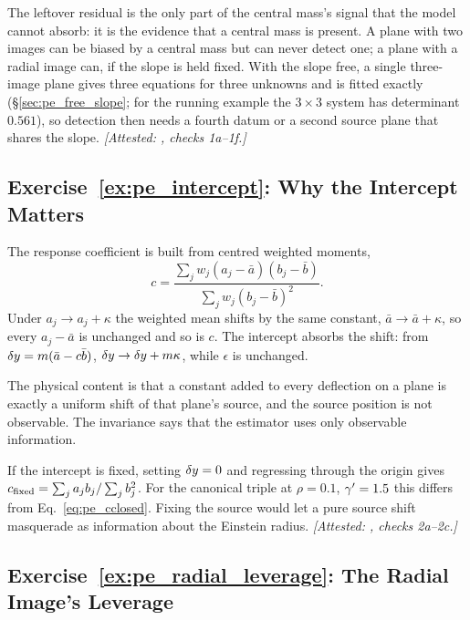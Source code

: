 The leftover residual is the only part of the central mass's signal
that the model cannot absorb: it is the evidence that a central mass is
present. A plane with
two images can be biased by a central mass but can never detect one; a
plane with a radial image can, if the slope is held fixed. With the
slope free, a single three-image plane gives three equations for three
unknowns and is fitted exactly (\S\ref{sec:pe_free_slope}; for the
running example the $3\times3$ system has determinant $0.561$), so
detection then needs a fourth datum or a second source plane that shares
the slope.
\emph{[Attested: , checks 1a--1f.]}

\subsection*{Exercise~\ref{ex:pe_intercept}: Why the Intercept Matters}

The response coefficient is built from centred weighted moments,
\[
  c=\frac{\sum_jw_j(a_j-\bar a)(b_j-\bar b)}{\sum_jw_j(b_j-\bar b)^2}.
\]
Under $a_j\to a_j+\kappa$ the weighted mean shifts by the same constant,
$\bar a\to\bar a+\kappa$, so every $a_j-\bar a$ is unchanged and so is
$c$. The intercept absorbs the shift: from
$\delta y=m(\bar a-c\bar b)$, $\delta y\to\delta y+m\kappa$,
while $\epsilon$ is unchanged.

The physical content is that a constant added to every deflection on a
plane is exactly a uniform shift of that plane's source, and the source
position is not observable. The invariance says that the estimator uses
only observable information.

If the intercept is fixed, setting $\delta y=0$ and regressing
through the origin gives $c_{\rm fixed}=\sum_ja_jb_j/\sum_jb_j^2$. For
the canonical triple at $\rho=0.1$, $\gamma'=1.5$ this differs from
Eq.~\eqref{eq:pe_cclosed}. Fixing the source would let a pure source
shift masquerade as information about the Einstein radius.
\emph{[Attested: , checks 2a--2c.]}

\subsection*{Exercise~\ref{ex:pe_radial_leverage}: The Radial Image's Leverage}

